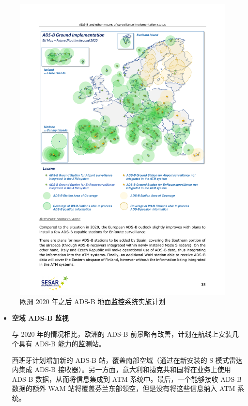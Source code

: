 \begin{itemize}
    \begin{figure}[!htb]
    \centering
    \includegraphics[width=15cm]{pic/20180515-sesar-ads-b-report_35.pdf}
    \caption{欧洲 2020 年之后 ADS-B 地面监控系统实施计划\protect\footnotemark}
    \label{fig:20180515-sesar-ads-b-report_35}
    \end{figure}


    \begin{itemize}
        \item \textbf{空域 ADS-B 监视}

        与 2020 年的情况相比，欧洲的 ADS-B 前景略有改善，计划在航线上安装几个具有 ADS-B 能力的监测站。

        西班牙计划增加新的 ADS-B 站，覆盖南部空域（通过在新安装的 S 模式雷达内集成 ADS-B 接收器）。另一方面，意大利和捷克共和国将在业务上使用 ADS-B 数据，从而将信息集成到 ATM 系统中。最后，一个能够接收 ADS-B 数据的额外 WAM 站将覆盖芬兰东部领空，但是没有将这些信息纳入 ATM 系统。


\end{itemize}
\end{itemize}
